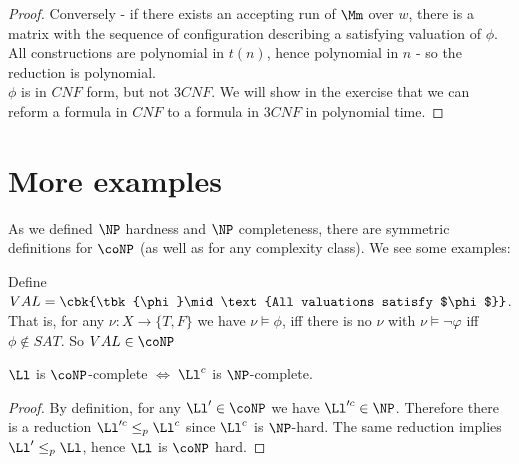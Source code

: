\begin{proof}
Conversely - if there exists an accepting run of $\Mm$ over $w$, there is a matrix with the sequence of configuration describing a satisfying valuation of $\phi$.\\

All constructions are polynomial in $t(n)$, hence polynomial in $n$ - so the reduction is polynomial.\\

$\phi$ is in $CNF$ form, but not $3CNF$. We will show in the exercise that we can reform a formula in $CNF$ to a formula in $3CNF$ in polynomial time.
\end{proof}
\section{More examples}
As we defined $\NP$ hardness and $\NP$ completeness, there are symmetric definitions for $\coNP$ (as well as for any complexity class). We see some examples:
\begin{example}
	Define $VAL = \cbk{\tbk{\phi}\mid \text{All valuations satisfy $\phi$}}$. That is, for any $\nu:X\to \{T,F\}$ we have $\nu \vDash \phi$, iff there is no $\nu$ with $\nu \vDash \neg \varphi$ iff $\phi\notin SAT$. So $VAL\in \coNP$
\end{example}
\begin{blueBox}
	\begin{thm}
		$\Ll$ is $\coNP$-complete $\iff$ $\Ll^c$ is $\NP$-complete.
	\end{thm}
\end{blueBox}
\begin{proof}
	By definition, for any $\Ll'\in \coNP$ we have $\Ll'^c\in \NP$. Therefore there is a reduction $\Ll'^c\leq_p \Ll^c$ since $\Ll^c$ is $\NP$-hard. The same reduction implies $\Ll'\leq_p \Ll$, hence $\Ll$ is $\coNP$ hard.
\end{proof}
